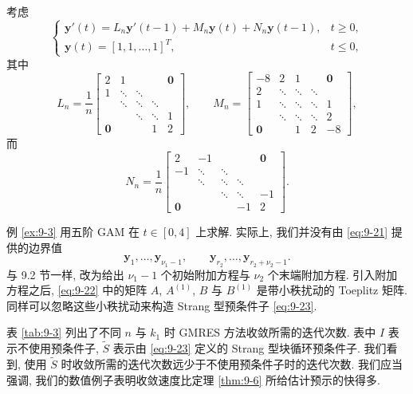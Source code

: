 \begin{example}
\label{ex:9-3}
考虑
\[
  \left\{
  \begin{array}{ll}
    \mathbf{y}'(t)=L_n\mathbf{y}'(t-1)+M_n\mathbf{y}(t)+N_n\mathbf{y}(t-1),
      & t\geqslant0,\\
    \mathbf{y}(t)=[1,1,\ldots,1]^T, & t\leqslant0,
  \end{array}
  \right.
\]
其中
\[
  L_n=\frac{1}{n}\begin{bmatrix}
    2 & 1 & & & \mathbf{0}\\
    1 & \ddots & \ddots & & \\
    & \ddots & \ddots & \ddots & \\
    & & \ddots & \ddots & 1\\
    \mathbf{0} & & & 1 & 2
  \end{bmatrix},\qquad
  M_n=\begin{bmatrix}
    -8 & 2 & 1 & & \mathbf{0}\\
    2 & \ddots & \ddots & \ddots & \\
    1 & \ddots & \ddots & \ddots & 1\\
    & \ddots & \ddots & \ddots & 2\\
    \mathbf{0} & & 1 & 2 & -8
  \end{bmatrix},
\]
而
\[
  N_n=\frac{1}{n}\begin{bmatrix}
    2 & -1 & & & \mathbf{0}\\
    -1 & \ddots & \ddots & & \\
    & \ddots & \ddots & \ddots & \\
    & & \ddots & \ddots & -1\\
    \mathbf{0} & & & -1 & 2
  \end{bmatrix}.
\]
\end{example}

例 \ref{ex:9-3} 用五阶 GAM 在 $t\in[0,4]$ 上求解. 实际上, 我们并没有由 \eqref{eq:9-21} 提供的边界值
\[
  \mathbf{y}_1,\ldots,\mathbf{y}_{\nu_1-1},\qquad
  \mathbf{y}_{r_2},\ldots,\mathbf{y}_{r_2+\nu_2-1}.
\]
与 9.2 节一样, 改为给出 $\nu_1-1$ 个初始附加方程与 $\nu_2$ 个末端附加方程. 引入附加方程之后, \eqref{eq:9-22} 中的矩阵 $A$, $A^{(1)}$, $B$ 与 $B^{(1)}$ 是带小秩扰动的 Toeplitz 矩阵. 同样可以忽略这些小秩扰动来构造 Strang 型预条件子 \eqref{eq:9-23}.

表 \ref{tab:9-3} 列出了不同 $n$ 与 $k_1$ 时 GMRES 方法收敛所需的迭代次数. 表中 $I$ 表示不使用预条件子, $\widetilde{S}$ 表示由 \eqref{eq:9-23} 定义的 Strang 型块循环预条件子. 我们看到, 使用 $\widetilde{S}$ 时收敛所需的迭代次数远少于不使用预条件子时的迭代次数. 我们应当强调, 我们的数值例子表明收敛速度比定理 \ref{thm:9-6} 所给估计预示的快得多.

